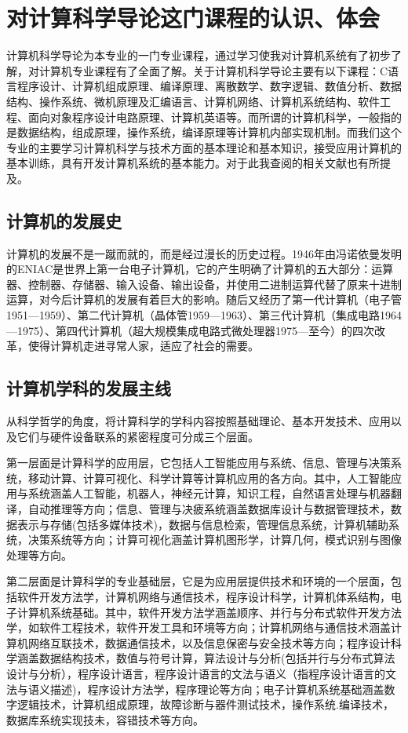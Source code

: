 \documentclass{article}
\begin{document}
\section{对计算科学导论这门课程的认识、体会}
计算机科学导论为本专业的一门专业课程，通过学习使我对计算机系统有了初步了解，对计算机专业课程有了全面了解。关于计算机科学导论主要有以下课程：C语言程序设计、计算机组成原理、编译原理、离散数学、数字逻辑、数值分析、数据结构、操作系统、微机原理及汇编语言、计算机网络、计算机系统结构、软件工程、面向对象程序设计电路原理、计算机英语等。而所谓的计算机科学，一般指的是数据结构，组成原理，操作系统，编译原理等计算机内部实现机制。而我们这个专业的主要学习计算机科学与技术方面的基本理论和基本知识，接受应用计算机的基本训练，具有开发计算机系统的基本能力。对于此我查阅的相关文献也有所提及\citep{jisuanjidaolun}。
\subsection{计算机的发展史}
计算机的发展不是一蹴而就的，而是经过漫长的历史过程。1946年由冯诺依曼发明的ENIAC是世界上第一台电子计算机，它的产生明确了计算机的五大部分：运算器、控制器、存储器、输入设备、输出设备，并使用二进制运算代替了原来十进制运算，对今后计算机的发展有着巨大的影响。随后又经历了第一代计算机（电子管1951—1959）、第二代计算机（晶体管1959—1963）、第三代计算机（集成电路1964—1975）、第四代计算机（超大规模集成电路式微处理器1975—至今）的四次改革，使得计算机走进寻常人家，适应了社会的需要。
\subsection{计算机学科的发展主线}
从科学哲学的角度，将计算科学的学科内容按照基础理论、基本开发技术、应用以及它们与硬件设备联系的紧密程度可分成三个层面。

第一层面是计算科学的应用层，它包括人工智能应用与系统、信息、管理与决策系统，移动计算、计算可视化、科学计算等计算机应用的各方向。其中，人工智能应用与系统涵盖人工智能，机器人，神经元计算，知识工程，自然语言处理与机器翻译，自动推理等方向；信息、管理与决疲系统涵盖数据库设计与数据管理技术，数据表示与存储(包括多媒体技术)，数据与信息检索，管理信息系统，计算机辅助系统，决策系统等方向；计算可视化涵盖计算机图形学，计算几何，模式识别与图像处理等方向。

第二层面是计算科学的专业基础层，它是为应用层提供技术和环境的一个层面，包括软件开发方法学，计算机网络与通信技术，程序设计科学，计算机体系结构，电子计算机系统基础。其中，软件开发方法学涵盖顺序、并行与分布式软件开发方法学，如软件工程技术，软件开发工具和环境等方向；计算机网络与通信技术涵盖计算机网络互联技术，数据通信技术，以及信息保密与安全技术等方向；程序设计科学涵盖数据结构技术，数值与符号计算，算法设计与分析(包括并行与分布式算法设计与分析），程序设计语言，程序设计语言的文法与语义（指程序设计语言的文法与语义描述)，程序设计方法学，程序理论等方向；电子计算机系统基础涵盖数字逻辑技术，计算机组成原理，故障诊断与器件测试技术，操作系统.编译技术，数据库系统实现技未，容错技术等方向。
\end{document}
